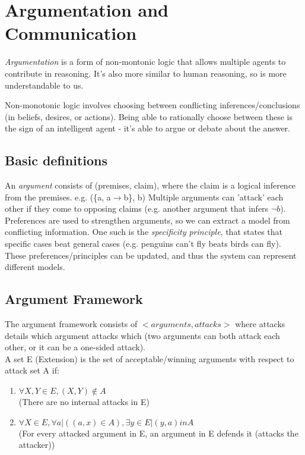 \section{Argumentation and Communication}
\emph{Argumentation} is a form of non-montonic logic that allows multiple agents to contribute in reasoning. It's also more similar to human reasoning, so is more understandable to us.

Non-monotonic logic involves choosing between conflicting inferences/conclusions (in beliefs, desires, or actions). Being able to rationally choose between these is the sign of an intelligent agent - it's able to argue or debate about the answer. 

\subsection{Basic definitions}
An \emph{argument} consists of (premises, claim), where the claim is a logical inference from the premises. e.g. (\{a, a$\rightarrow$b\}, b) Multiple arguments can 'attack' each other if they come to opposing claims (e.g. another argument that infers $\neg b$). \\

Preferences are used to strengthen arguments, so we can extract a model from conflicting information. One such is the \emph{specificity principle}, that states that specific cases beat general cases (e.g. penguins can't fly beats birds can fly). These preferences/principles can be updated, and thus the system can represent different models.

\subsection{Argument Framework}
The argument framework consists of $<arguments,attacks>$ where attacks details which argument attacks which (two arguments can both attack each other, or it can be a one-sided attack).\\
A set E (Extension) is the set of acceptable/winning arguments with respect to attack set A if:
\begin{enumerate}
    \item $\forall X,Y \in E, (X,Y) \notin A$\\
        \qquad (There are no internal attacks in E) 
    \item $\forall X \in E, \forall a | ((a,x)\in A), \exists y \in E | (y,a) in A$ \\
        \qquad (For every attacked argument in E, an argument in E defends it (attacks the attacker))
\end{enumerate}

